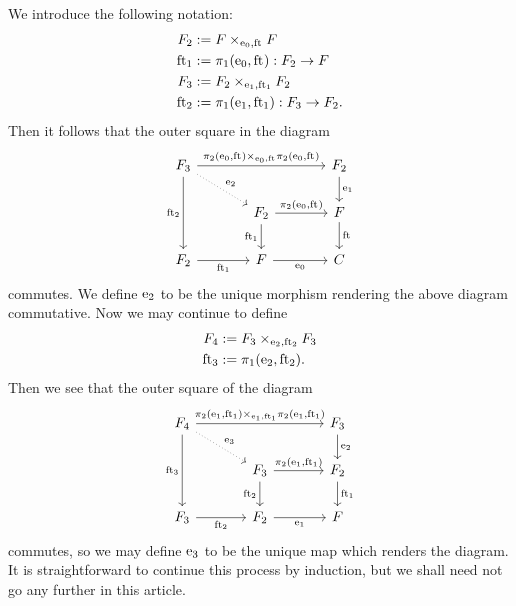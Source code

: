 \begin{defn}
We introduce the following notation:
\begin{align*}
\stesysf_2 
  & := \stesysff
  \\
\eft[1] 
  & := \pullbackpr{1}{\ectxext}{\eft} : \stesysf_2\to\stesysf
  \\
\stesysf_3 & := \pullback{\stesysf_2}{\stesysf_2}{\efamext}{\eft[1]}
  \\
\eft[2]
  & := \pullbackpr{1}{\efamext}{\eft[1]} : \stesysf_3\to\stesysf_2.
\end{align*}
Then it follows that the outer square in the diagram
\begin{equation*}
\begin{tikzcd}[column sep=large]
\stesysf_3
  \ar[dotted]{dr}{\eext{2}}
  \ar{rr}{\pullback{\pullbackpr{2}{\ectxext}{\eft}}{\pullbackpr{2}{\ectxext}{\eft}}{\ectxext}{\eft}}
  \ar{dd}[swap]{\eft[2]}
  & 
  &
\stesysf_2
  \ar{d}{\efamext}
  \\
  &
\stesysf_2
  \ar{d}[swap]{\eft[1]}
  \ar{r}{\pullbackpr{2}{\ectxext}{\eft}}
  &
\stesysf
  \ar{d}{\eft}
  \\
\stesysf_2
  \ar{r}[swap]{\eft[1]}
  &
\stesysf
  \ar{r}[swap]{\ectxext}
  &
\stesysc
\end{tikzcd}
\end{equation*}
commutes. We define $\mathrm{e}_{2}$ to be the unique morphism rendering the above diagram
commutative. Now we may continue to define
\begin{align*}
\stesysf_4 
  & := 
\pullback{\stesysf_3}{\stesysf_3}{\eext{2}}{\eft[2]}
  \\
\eft[3] 
  & := 
\pullbackpr{1}{\eext{2}}{\eft[2]}.
\end{align*}
Then we see that the outer square of the diagram
\begin{equation*}
\begin{tikzcd}[column sep=large]
\stesysf_4
  \ar[dotted]{dr}{\eext{3}}
  \ar{rr}{\pullback{\pullbackpr{2}{\efamext}{\eft[1]}}{\pullbackpr{2}{\efamext}{\eft[1]}}{\efamext}{\eft[1]}}
  \ar{dd}[swap]{\eft[3]}
  & 
  &
\stesysf_3
  \ar{d}{\eext{2}}
  \\
  &
\stesysf_3
  \ar{d}[swap]{\eft[2]}
  \ar{r}{\pullbackpr{2}{\efamext}{\eft[1]}}
  &
\stesysf_2
  \ar{d}{\eft[1]}
  \\
\stesysf_3
  \ar{r}[swap]{\eft[2]}
  &
\stesysf_2
  \ar{r}[swap]{\efamext}
  &
\stesysf
\end{tikzcd}
\end{equation*}
commutes,
so we may define $\mathrm{e}_{3}$ to be the unique map which renders the diagram. It
is straightforward to continue this process by induction, but we shall need not
go any further in this article.
\end{defn}

